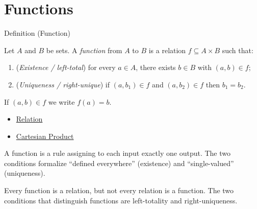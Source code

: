 
\section{Functions}


\begin{definitionbox}{Definition (Function)}
\begin{definition}[Function]\label{def:function}
Let $A$ and $B$ be sets. A \emph{function} from $A$ to $B$ is a relation
$f \subseteq A \times B$ such that:
\begin{enumerate}[label=(\roman*)]
\item (\emph{Existence / left-total}) for every $a \in A$, there exists $b \in B$
  with $(a,b) \in f$;
\item (\emph{Uniqueness / right-unique}) if $(a,b_1) \in f$ and $(a,b_2) \in f$
  then $b_1 = b_2$.
\end{enumerate}
If $(a,b) \in f$ we write $f(a) = b$.
\end{definition}
\end{definitionbox}

\begin{dependencies}
\begin{itemize}
  \item \hyperref[def:relation]{Relation}
  \item \hyperref[def:cartesian-product-rel]{Cartesian Product}
\end{itemize}
\end{dependencies}

\begin{remark*}
A function is a rule assigning to each input exactly one output. The two
conditions formalize ``defined everywhere'' (existence) and ``single-valued''
(uniqueness).
\end{remark*}

\begin{remark*}
Every function is a relation, but not every relation is a function. The two
conditions that distinguish functions are left-totality and right-uniqueness.
\end{remark*}

